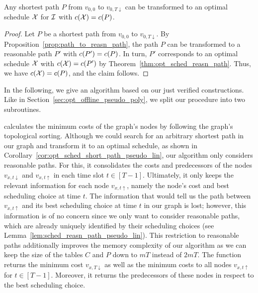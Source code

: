 \begin{cor}\label{cor:opt_sched_short_path_pseudo_lin}
Any shortest path $P$ from $v_{0,0}$ to $v_{0,T\downarrow}$ can be transformed to an optimal schedule $\mathcal{X}$ for $\mathcal{I}$ with $c(\mathcal{X})=c(P)$.
\end{cor}
\begin{proof}
Let $P$ be a shortest path from $v_{0,0}$ to $v_{0,T\downarrow}$. By Proposition~\ref{prop:path_to_reasn_path}, the path $P$ can be transformed to a reasonable path $P'$ with $c(P')=c(P)$.
In turn, $P'$ corresponds to an optimal schedule $\mathcal{X}$ with $c(\mathcal{X})=c(P')$ by Theorem~\ref{thm:opt_sched_reasn_path}. Thus, we have $c(\mathcal{X})=c(P)$, and the claim follows.
\end{proof}
In the following, we give an algorithm based on our just verified constructions. Like in Section~\ref{sec:opt_offline_pseudo_poly}, we split our procedure into two subroutines.

 calculates the minimum costs of the graph's nodes by following the graph's topological sorting. Although we could search for an arbitrary shortest path in our graph and transform it to an optimal schedule, as shown in Corollary~\ref{cor:opt_sched_short_path_pseudo_lin}, our algorithm only considers reasonable paths. 
For this, it consolidates the costs and predecessors of the nodes $v_{x,t\downarrow}$ and $v_{x,t\uparrow}$ in each time slot $t\in[T-1]$. Ultimately, it only keeps the relevant information for each node $v_{x,t\uparrow}$, namely the node's cost and best scheduling choice at time $t$. The information that would tell us the path between $v_{x,t\uparrow}$ and its best scheduling choice at time $t$ in our graph is lost; however, this information is of no concern since we only want to consider reasonable paths, which are already uniquely identified by their scheduling choices (see Lemma~\ref{lem:sched_reasn_path_pseudo_lin}). This restriction to reasonable paths additionally improves the memory complexity of our algorithm as we can keep the size of the tables $C$ and $P$ down to $mT$ instead of $2mT$. The function returns the minimum cost $v_{x,T\downarrow}$ as well as the minimum costs to all nodes $v_{x,t\uparrow}$ for $t\in[T-1]$. Moreover, it returns the predecessors of these nodes in respect to the best scheduling choice.

